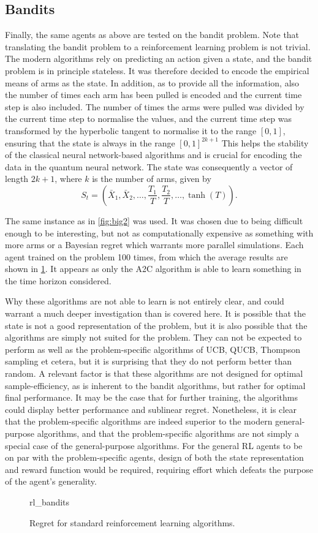 \subsection{Bandits}
Finally, the same agents as above are tested on the bandit problem.
Note that translating the bandit problem to a reinforcement learning problem is not trivial.
The modern algorithms rely on predicting an action given a state, and the bandit problem is in principle stateless.
It was therefore decided to encode the empirical means of arms as the state.
In addition, as to provide all the information, also the number of times each arm has been pulled is encoded and the current time step is also included.
The number of times the arms were pulled was divided by the current time step to normalise the values, and the current time step was transformed by the hyperbolic tangent to normalise it to the range $[0, 1]$, ensuring that the state is always in the range $[0, 1]^{2k+1}$
This helps the stability of the classical neural network-based algorithms and is crucial for encoding the data in the quantum neural network.
The state was consequently a vector of length $2k+1$, where $k$ is the number of arms, given by
\begin{equation}
    \label{eq:rl_bandit_state}
    S_t = \left(
    \bar{X}_1,
    \bar{X}_2,
    \ldots,
    \frac{T_1}{T},
    \frac{T_2}{T},
    \ldots,
    \tanh(T)
    \right).
\end{equation}

The same instance as in \cref{fig:big2} was used.
It was chosen due to being difficult enough to be interesting, but not as computationally expensive as something with more arms or a Bayesian regret which warrants more parallel simulations.
Each agent trained on the problem 100 times, from which the average results are shown in \cref{fig:rl_bandits}.
It appears as only the A2C algorithm is able to learn something in the time horizon considered.

Why these algorithms are not able to learn is not entirely clear, and could warrant a much deeper investigation than is covered here.
It is possible that the state is not a good representation of the problem, but it is also possible that the algorithms are simply not suited for the problem.
They can not be expected to perform as well as the problem-specific algorithms of UCB, QUCB, Thompson sampling et cetera, but it is surprising that they do not perform better than random.
A relevant factor is that these algorithms are not designed for optimal sample-efficiency, as is inherent to the bandit algorithms, but rather for optimal final performance.
It may be the case that for further training, the algorithms could display better performance and sublinear regret.
Nonetheless, it is clear that the problem-specific algorithms are indeed superior to the modern general-purpose algorithms, and that the problem-specific algorithms are not simply a special case of the general-purpose algorithms.
For the general RL agents to be on par with the problem-specific agents, design of both the state representation and reward function would be required, requiring effort which defeats the purpose of the agent's generality.

\begin{figure}
    \centering
    {rl_bandits}
    \caption{
        Regret for standard reinforcement learning algorithms.
    }
    \label{fig:rl_bandits}
\end{figure}